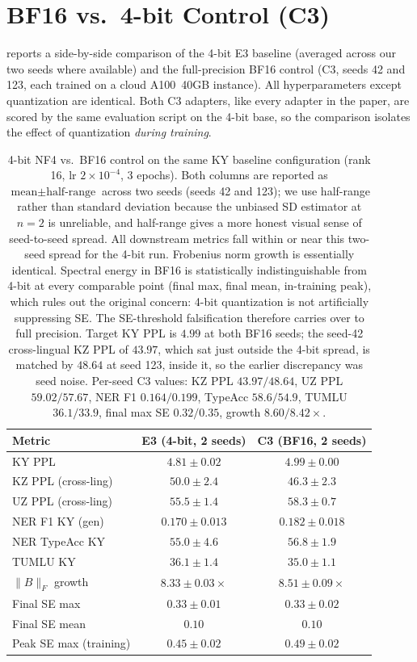 \documentclass[11pt]{article}
\begin{document}
\section{BF16 vs.\ 4-bit Control (C3)}
\label{app:bf16}

 reports a side-by-side comparison of the 4-bit E3 baseline (averaged across our two seeds where available) and the full-precision BF16 control (C3, seeds 42 and 123, each trained on a cloud A100~40GB instance). All hyperparameters except quantization are identical. Both C3 adapters, like every adapter in the paper, are scored by the same evaluation script on the 4-bit base, so the comparison isolates the effect of quantization \emph{during training}.

\begin{table}[!htbp]
\centering
\small
\begin{tabular}{lcc}
\toprule
\textbf{Metric} & \textbf{E3 (4-bit, 2 seeds)} & \textbf{C3 (BF16, 2 seeds)} \\
\midrule
KY PPL              & $4.81 \pm 0.02$    & $4.99 \pm 0.00$ \\
KZ PPL (cross-ling) & $50.0 \pm 2.4$     & $46.3 \pm 2.3$ \\
UZ PPL (cross-ling) & $55.5 \pm 1.4$     & $58.3 \pm 0.7$ \\
NER F1 KY (gen)     & $0.170 \pm 0.013$  & $0.182 \pm 0.018$ \\
NER TypeAcc KY      & $55.0 \pm 4.6$     & $56.8 \pm 1.9$ \\
TUMLU KY            & $36.1 \pm 1.4$     & $35.0 \pm 1.1$ \\
$\|B\|_F$ growth    & $8.33 \pm 0.03\times$ & $8.51 \pm 0.09\times$ \\
Final SE max        & $0.33 \pm 0.01$    & $0.33 \pm 0.02$ \\
Final SE mean       & $0.10$             & $0.10$ \\
Peak SE max (training) & $0.45 \pm 0.02$ & $0.49 \pm 0.02$ \\
\bottomrule
\end{tabular}
\caption{4-bit NF4 vs.\ BF16 control on the same KY baseline configuration (rank 16, lr $2{\times}10^{-4}$, 3 epochs). Both columns are reported as $\text{mean} \pm \text{half-range}$ across two seeds (seeds 42 and 123); we use half-range rather than standard deviation because the unbiased SD estimator at $n{=}2$ is unreliable, and half-range gives a more honest visual sense of seed-to-seed spread. All downstream metrics fall within or near this two-seed spread for the 4-bit run. Frobenius norm growth is essentially identical. Spectral energy in BF16 is statistically indistinguishable from 4-bit at every comparable point (final max, final mean, in-training peak), which rules out the original concern: 4-bit quantization is not artificially suppressing SE. The SE-threshold falsification therefore carries over to full precision. Target KY PPL is $4.99$ at both BF16 seeds; the seed-42 cross-lingual KZ PPL of $43.97$, which sat just outside the 4-bit spread, is matched by $48.64$ at seed 123, inside it, so the earlier discrepancy was seed noise. Per-seed C3 values: KZ PPL $43.97/48.64$, UZ PPL $59.02/57.67$, NER F1 $0.164/0.199$, TypeAcc $58.6/54.9$, TUMLU $36.1/33.9$, final max SE $0.32/0.35$, growth $8.60/8.42\times$.}

\end{table}
\end{document}
